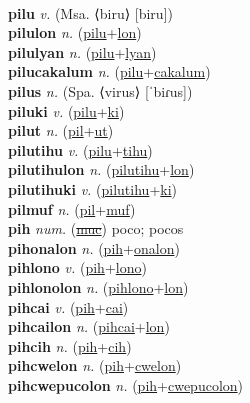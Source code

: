  \label{'pilipinastilip} \\
\textbf{pilu} \textit{v.} (Msa. ⟨biru⟩ [biru])
 \label{pilu} \\
\textbf{pilulon} \textit{n.} (\hyperref[pilu]{pilu}+\hyperref[lon]{lon})
 \label{pilulon} \\
\textbf{pilulyan} \textit{n.} (\hyperref[pilu]{pilu}+\hyperref[lyan]{lyan})
 \label{pilulyan} \\
\textbf{pilucakalum} \textit{n.} (\hyperref[pilu]{pilu}+\hyperref[cakalum]{cakalum})
 \label{pilucakalum} \\
\textbf{pilus} \textit{n.} (Spa. ⟨virus⟩ [ˈbiɾus])
 \label{pilus} \\
\textbf{piluki} \textit{v.} (\hyperref[pilu]{pilu}+\hyperref[ki]{ki})
 \label{piluki} \\
\textbf{pilut} \textit{n.} (\hyperref[pil]{pil}+\hyperref[ut]{ut})
 \label{pilut} \\
\textbf{pilutihu} \textit{v.} (\hyperref[pilu]{pilu}+\hyperref[tihu]{tihu})
 \label{pilutihu} \\
\textbf{pilutihulon} \textit{n.} (\hyperref[pilutihu]{pilutihu}+\hyperref[lon]{lon})
 \label{pilutihulon} \\
\textbf{pilutihuki} \textit{v.} (\hyperref[pilutihu]{pilutihu}+\hyperref[ki]{ki})
 \label{pilutihuki} \\
\textbf{pilmuf} \textit{n.} (\hyperref[pil]{pil}+\hyperref[muf]{muf})
 \label{pilmuf} \\
\textbf{pih} \textit{num.} (\hyperref[muc]{\sout{muc}})
poco; pocos \label{pih} \\
\textbf{pihonalon} \textit{n.} (\hyperref[pih]{pih}+\hyperref[onalon]{onalon})
 \label{pihonalon} \\
\textbf{pihlono} \textit{v.} (\hyperref[pih]{pih}+\hyperref[lono]{lono})
 \label{pihlono} \\
\textbf{pihlonolon} \textit{n.} (\hyperref[pihlono]{pihlono}+\hyperref[lon]{lon})
 \label{pihlonolon} \\
\textbf{pihcai} \textit{v.} (\hyperref[pih]{pih}+\hyperref[cai]{cai})
 \label{pihcai} \\
\textbf{pihcailon} \textit{n.} (\hyperref[pihcai]{pihcai}+\hyperref[lon]{lon})
 \label{pihcailon} \\
\textbf{pihcih} \textit{n.} (\hyperref[pih]{pih}+\hyperref[cih]{cih})
 \label{pihcih} \\
\textbf{pihcwelon} \textit{n.} (\hyperref[pih]{pih}+\hyperref[cwelon]{cwelon})
 \label{pihcwelon} \\
\textbf{pihcwepucolon} \textit{n.} (\hyperref[pih]{pih}+\hyperref[cwepucolon]{cwepucolon})
